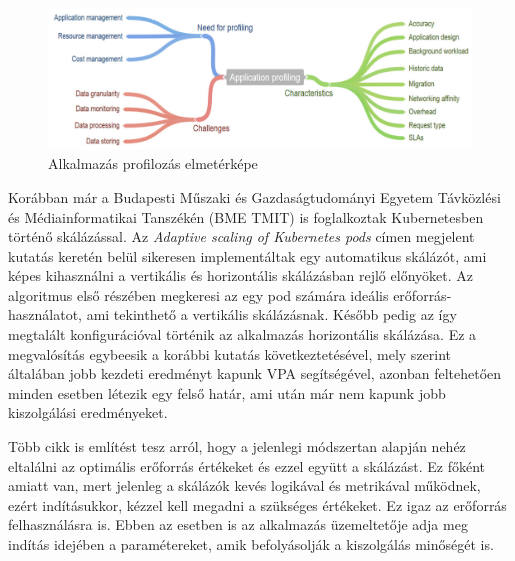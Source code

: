 \begin{figure}[!ht]
\centering
\includegraphics[width=150mm, keepaspectratio]{figures/applicationprofiling.png}
\caption{Alkalmazás profilozás elmetérképe\citep{CloudResourceManagement}}
\label{fig:applicationprofiling}
\end{figure}

Korábban már a Budapesti Műszaki és Gazdaságtudományi Egyetem Távközlési és Médiainformatikai Tanszékén (BME TMIT) is foglalkoztak Kubernetesben történő skálázással. 
Az \emph{Adaptive scaling of Kubernetes pods}\cite{AdaptiveScalingOfPods} címen megjelent kutatás keretén belül sikeresen implementáltak egy automatikus skálázót, ami képes kihasználni a vertikális és horizontális skálázásban rejlő előnyöket. 
Az algoritmus első részében megkeresi az egy pod számára ideális erőforrás-használatot, ami tekinthető a vertikális skálázásnak. 
Később pedig az így megtalált konfigurációval történik az alkalmazás horizontális skálázása. 
Ez a megvalósítás egybeesik a korábbi kutatás következtetésével\citep{bscThesis}, mely szerint általában jobb kezdeti eredményt kapunk VPA segítségével, azonban feltehetően minden esetben létezik egy felső határ, ami után már nem kapunk jobb kiszolgálási eredményeket. 


Több cikk\cite{AdaptiveScalingOfPods}\citep{PredictingUsageAndProactiveScaling} is említést tesz arról, hogy a jelenlegi módszertan alapján nehéz eltalálni az optimális erőforrás értékeket és ezzel együtt a skálázást.
Ez főként amiatt van, mert jelenleg a skálázók kevés logikával és metrikával
működnek, ezért indításukkor, kézzel kell megadni a szükséges értékeket.
Ez igaz az erőforrás felhasználásra is.
Ebben az esetben is az alkalmazás üzemeltetője adja meg indítás idejében a paramétereket, amik befolyásolják a kiszolgálás minőségét is. 

